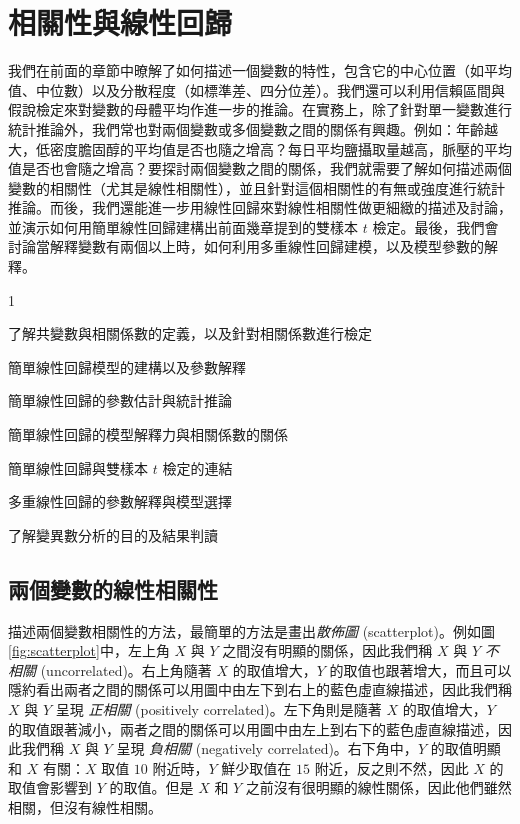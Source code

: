 \chapter{相關性與線性回歸}

    我們在前面的章節中暸解了如何描述一個變數的特性，包含它的中心位置（如平均值、中位數）以及分散程度（如標準差、四分位差）。我們還可以利用信賴區間與假說檢定來對變數的母體平均作進一步的推論。在實務上，除了針對單一變數進行統計推論外，我們常也對兩個變數或多個變數之間的關係有興趣。例如：年齡越大，低密度膽固醇的平均值是否也隨之增高？每日平均鹽攝取量越高，脈壓的平均值是否也會隨之增高？要探討兩個變數之間的關係，我們就需要了解如何描述兩個變數的相關性（尤其是線性相關性），並且針對這個相關性的有無或強度進行統計推論。而後，我們還能進一步用線性回歸來對線性相關性做更細緻的描述及討論，並演示如何用簡單線性回歸建構出前面幾章提到的雙樣本 $t$ 檢定。最後，我們會討論當解釋變數有兩個以上時，如何利用多重線性回歸建模，以及模型參數的解釋。
    
    \begin{introduction}{1}
        \item 了解共變數與相關係數的定義，以及針對相關係數進行檢定
        \item 簡單線性回歸模型的建構以及參數解釋
        \item 簡單線性回歸的參數估計與統計推論
        \item 簡單線性回歸的模型解釋力與相關係數的關係
        \item 簡單線性回歸與雙樣本 $t$ 檢定的連結
        \item 多重線性回歸的參數解釋與模型選擇
        \item 了解變異數分析的目的及結果判讀
    \end{introduction}

\section{兩個變數的線性相關性}
    描述兩個變數相關性的方法，最簡單的方法是畫出\textit{散佈圖} (scatterplot)。例如圖\ref{fig:scatterplot}中，左上角 $X$ 與 $Y$ 之間沒有明顯的關係，因此我們稱 $X$ 與 $Y$ \textit{不相關} (uncorrelated)。右上角隨著 $X$ 的取值增大，$Y$ 的取值也跟著增大，而且可以隱約看出兩者之間的關係可以用圖中由左下到右上的藍色虛直線描述，因此我們稱 $X$ 與 $Y$ 呈現 \textit{正相關} (positively correlated)。左下角則是隨著 $X$ 的取值增大，$Y$ 的取值跟著減小，兩者之間的關係可以用圖中由左上到右下的藍色虛直線描述，因此我們稱 $X$ 與 $Y$ 呈現 \textit{負相關} (negatively correlated)。右下角中，$Y$ 的取值明顯和 $X$ 有關：$X$ 取值 $10$ 附近時，$Y$ 鮮少取值在 $15$ 附近，反之則不然，因此 $X$ 的取值會影響到 $Y$ 的取值。但是 $X$ 和 $Y$ 之前沒有很明顯的線性關係，因此他們雖然相關，但沒有線性相關。

